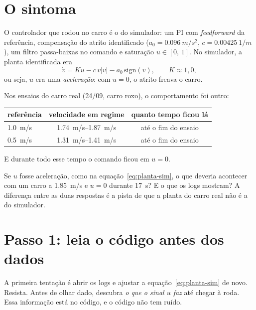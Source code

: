 \documentclass[11pt,a4paper,oneside,openany]{book}
\begin{document}
\section{O sintoma}

O controlador que rodou no carro é o do simulador: um PI com
\emph{feedforward} da referência, compensação do atrito identificado
($a_0 = \SI{0,096}{m/s^2}$, $c = \SI{0,00425}{1/m}$), um filtro passa-baixas no
comando e saturação $u \in [0,\,1]$. No simulador, a planta identificada era
\begin{equation}
  \dot v = K u - c\, v|v| - a_0\,\mathrm{sign}(v), \qquad K \approx 1{,}0,
  \label{eq:planta-sim}
\end{equation}
ou seja, $u$ era uma \emph{aceleração}: com $u=0$, o atrito freava o carro.

Nos ensaios do carro real (24/09, carro roxo), o comportamento foi outro:

\begin{center}
\begin{tabular}{lcc}
\toprule
referência & velocidade em regime & quanto tempo ficou lá\\
\midrule
\SI{1,0}{m/s} & \SIrange{1,74}{1,87}{m/s} & até o fim do ensaio\\
\SI{0,5}{m/s} & \SIrange{1,31}{1,41}{m/s} & até o fim do ensaio\\
\bottomrule
\end{tabular}
\end{center}

E durante todo esse tempo o comando ficou em $u = 0$.

\begin{pense}
Se $u$ fosse aceleração, como na equação~\eqref{eq:planta-sim}, o que deveria acontecer
com um carro a \SI{1,85}{m/s} e $u = 0$ durante \SI{17}{s}? E o que os logs mostram?
A diferença entre as duas respostas é a pista de que a planta do carro real não é a do
simulador.
\end{pense}

\section{Passo 1: leia o código antes dos dados}

A primeira tentação é abrir os logs e ajustar a equação~\eqref{eq:planta-sim} de novo.
Resista. Antes de olhar dado, descubra \emph{o que o sinal $u$ faz} até chegar à roda.
Essa informação está no código, e o código não tem ruído.
\end{document}
